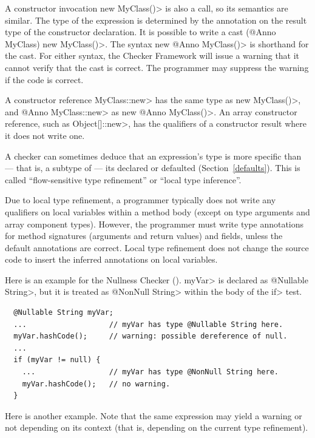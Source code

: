 A constructor invocation \<new MyClass()> is also a call, so its semantics
are similar.  The type of the expression is determined by the annotation on
the result type of the constructor declaration.  It is possible to write a cast
\<(@Anno MyClass) new MyClass()>.  The syntax \<new @Anno MyClass()> is shorthand
for the cast.  For either syntax, the Checker Framework will issue a
warning that it cannot verify that the cast is correct.  The programmer may
suppress the warning if the code is correct.

A constructor reference \<MyClass::new> has the same type as \<new MyClass()>,
and \<@Anno MyClass::new> as \<new @Anno MyClass()>.  An array constructor
reference, such as \<Object[]::new>, has the qualifiers of a constructor result
where it does not write one.



A checker can sometimes deduce that an expression's type is more specific
than --- that is, a subtype of --- its declared or defaulted (Section~\ref{defaults}).
This is called ``flow-sensitive type refinement'' or ``local type inference''.

Due to local type refinement, a programmer typically
does not write any qualifiers on local variables within a method body
(except on type arguments and array component types).
However, the programmer must write type annotations for method
signatures (arguments and return values) and fields, unless the default
annotations are correct.
Local type refinement does not change the source code to insert the
inferred annotations on local variables.



Here is an example for the Nullness Checker
().
\<myVar> is declared as \<@Nullable String>, but
it is treated as \<@NonNull String> within the body of the \<if> test.

\begin{Verbatim}
  @Nullable String myVar;
  ...                   // myVar has type @Nullable String here.
  myVar.hashCode();     // warning: possible dereference of null.
  ...
  if (myVar != null) {
    ...                 // myVar has type @NonNull String here.
    myVar.hashCode();   // no warning.
  }
\end{Verbatim}

Here is another example.
Note that the same expression may yield a
warning or not depending on its context (that is, depending on the current
type refinement).

